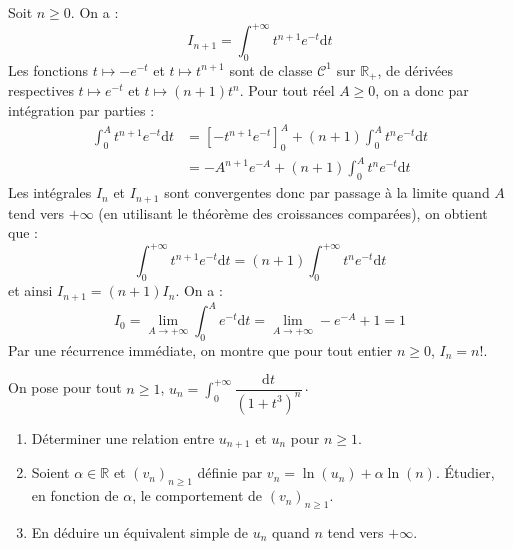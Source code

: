 \documentclass[a4paper,twoside,french,10pt]{VcCours}
\newcommand{\dt}{\text{d}t}
\begin{document}
\medskip

\noindent Soit $n \geq 0$. On a :
$$ I_{n+1} = \int_0^{+ \infty} t^{n+1} e^{-t} \dt$$
Les fonctions $t \mapsto -e^{-t}$ et $t \mapsto t^{n+1}$ sont de classe $\mathcal{C}^1$ sur $\mathbb{R}_+$, de dérivées respectives $t \mapsto e^{-t}$ et $t \mapsto (n+1)t^n$. Pour tout réel $A \geq 0$, on a donc par intégration par parties :
\begin{align*}
\int_0^A t^{n+1} e^{-t} \dt & = \left[- t^{n+1} e^{-t} \right]_0^A +  (n+1) \int_0^A t^{n} e^{-t} \dt \\
& = -A^{n+1} e^{-A} +  (n+1) \int_0^A t^{n} e^{-t} \dt
\end{align*}
Les intégrales $I_n$ et $I_{n+1}$ sont convergentes donc par passage à la limite quand $A$ tend vers $+ \infty$ (en utilisant le théorème des croissances comparées), on obtient que :
$$ \int_0^{+ \infty} t^{n+1} e^{-t} \dt = (n+1)\int_0^{+ \infty} t^{n} e^{-t} \dt$$
et ainsi $I_{n+1}=(n+1) I_n$. On a :
$$ I_0 = \lim_{A \rightarrow + \infty} \int_0^A e^{-t} \dt = \lim_{A \rightarrow + \infty} -e^{-A}+1 = 1$$
Par une récurrence immédiate, on montre que pour tout entier $n \geq 0$, $I_n=n!$.

\begin{Exercice}{} On pose pour tout $n \geq 1$, $u_n = \int_{0}^{+ \infty} \dfrac{\dt}{(1+t^3)^n} \cdot$
\begin{enumerate}
\item Déterminer une relation entre $u_{n+1}$ et $u_n$ pour $n \geq 1$.
\item Soient $\alpha \in \mathbb{R}$ et $(v_n)_{n \geq 1}$ définie par $v_n = \ln(u_n) + \alpha \ln(n)$. Étudier, en fonction de $\alpha$, le comportement de $(v_n)_{n \geq 1}$.
\item En déduire un équivalent simple de $u_n$ quand $n$ tend vers $+ \infty$.
\end{enumerate}
\end{Exercice} 
\end{document}

